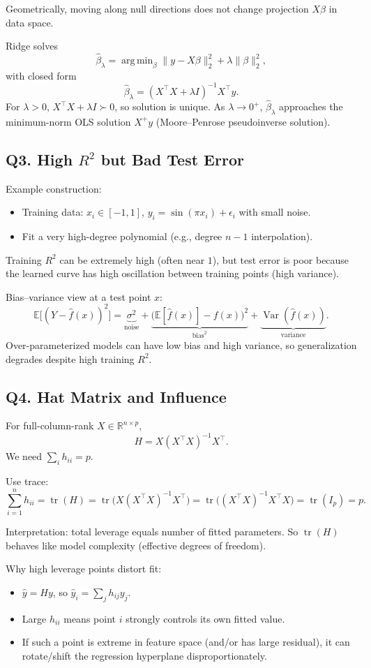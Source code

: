 \documentclass[11pt]{article}
\newcommand{\R}{\mathbb{R}}
\newcommand{\E}{\mathbb{E}}
\newcommand{\1}{\mathbf{1}}
\newcommand{\argmin}{\mathop{\mathrm{arg\,min}}}
\begin{document}
Geometrically, moving along null directions does not change projection $X\beta$ in data space.

Ridge solves
\[
\hat\beta_\lambda=\argmin_\beta\|y-X\beta\|_2^2+\lambda\|\beta\|_2^2,
\]
with closed form
\[
\hat\beta_\lambda=(X^\top X+\lambda I)^{-1}X^\top y.
\]
For $\lambda>0$, $X^\top X+\lambda I\succ0$, so solution is unique.
As $\lambda\to0^+$, $\hat\beta_\lambda$ approaches the minimum-norm OLS solution $X^+y$ (Moore--Penrose pseudoinverse solution).

\subsection*{Q3. High $R^2$ but Bad Test Error}
Example construction:
\begin{itemize}
\item Training data: $x_i\in[-1,1]$, $y_i=\sin(\pi x_i)+\epsilon_i$ with small noise.
\item Fit a very high-degree polynomial (e.g., degree $n-1$ interpolation).
\end{itemize}
Training $R^2$ can be extremely high (often near $1$), but test error is poor because the learned curve has high oscillation between training points (high variance).

Bias--variance view at a test point $x$:
\[
\E\big[(Y-\hat f(x))^2\big]
=\underbrace{\sigma^2}_{\text{noise}}+\underbrace{\big(\E[\hat f(x)]-f(x)\big)^2}_{\text{bias}^2}+\underbrace{\operatorname{Var}(\hat f(x))}_{\text{variance}}.
\]
Over-parameterized models can have low bias and high variance, so generalization degrades despite high training $R^2$.

\subsection*{Q4. Hat Matrix and Influence}
For full-column-rank $X\in\R^{n\times p}$,
\[
H=X(X^\top X)^{-1}X^\top.
\]
We need $\sum_i h_{ii}=p$.

Use trace:
\[
\sum_{i=1}^n h_{ii}=\operatorname{tr}(H)
=\operatorname{tr}\big(X(X^\top X)^{-1}X^\top\big)
=\operatorname{tr}\big((X^\top X)^{-1}X^\top X\big)
=\operatorname{tr}(I_p)=p.
\]

Interpretation: total leverage equals number of fitted parameters. So $\operatorname{tr}(H)$ behaves like model complexity (effective degrees of freedom).

Why high leverage points distort fit:
\begin{itemize}
\item $\hat y=Hy$, so $\hat y_i=\sum_j h_{ij}y_j$.
\item Large $h_{ii}$ means point $i$ strongly controls its own fitted value.
\item If such a point is extreme in feature space (and/or has large residual), it can rotate/shift the regression hyperplane disproportionately.
\end{itemize}
\end{document}

